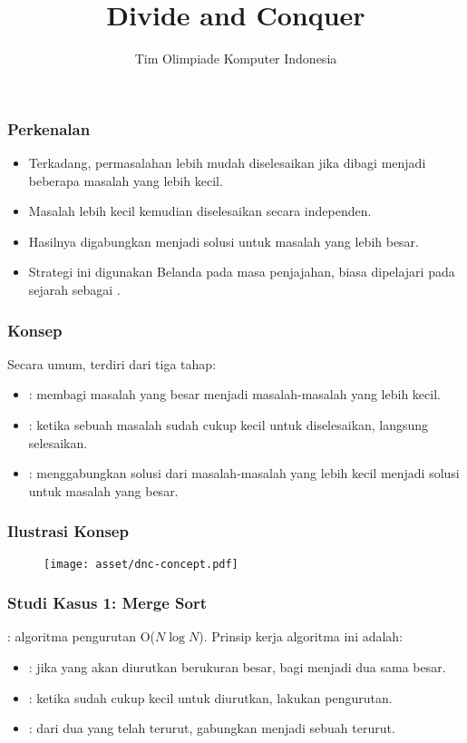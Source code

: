

\title{Divide and Conquer}
\author{Tim Olimpiade Komputer Indonesia}
\date{}



\begin{frame}
\titlepage
\end{frame}

\begin{frame}
\frametitle{Perkenalan}
\begin{itemize}
  \item Terkadang, permasalahan lebih mudah diselesaikan jika dibagi menjadi beberapa masalah yang lebih kecil.
  \item Masalah lebih kecil kemudian diselesaikan secara independen.
  \item Hasilnya digabungkan menjadi solusi untuk masalah yang lebih besar.
  \item Strategi ini digunakan Belanda pada masa penjajahan, biasa dipelajari pada sejarah sebagai .
\end{itemize}
\end{frame}

\begin{frame}
\frametitle{Konsep}
Secara umum, \fdivideAndConquer terdiri dari tiga tahap:
\begin{itemize}
  \item {}: membagi masalah yang besar menjadi masalah-masalah yang lebih kecil.
  \item {}: ketika sebuah masalah sudah cukup kecil untuk diselesaikan, langsung selesaikan.
  \item {}: menggabungkan solusi dari masalah-masalah yang lebih kecil menjadi solusi untuk masalah yang besar.
\end{itemize}
\end{frame}

\begin{frame}
\frametitle{Ilustrasi Konsep}
\begin{figure}
  \texttt{[image: asset/dnc-concept.pdf]}
\end{figure}
\end{frame}

\begin{frame}
\frametitle{Studi Kasus 1: Merge Sort}
\newTerm{\fMergeSort}: algoritma pengurutan O($N \log{N}$).
\newline
\newline
Prinsip kerja algoritma ini adalah:
\begin{itemize}
  \item {}: jika \farray yang akan diurutkan berukuran besar, bagi menjadi dua \farray sama besar.
  \item {}: ketika \farray sudah cukup kecil untuk diurutkan, lakukan pengurutan.
  \item {}: dari dua \farray yang telah terurut, gabungkan menjadi sebuah \farray terurut.
\end{itemize}
\end{frame}

